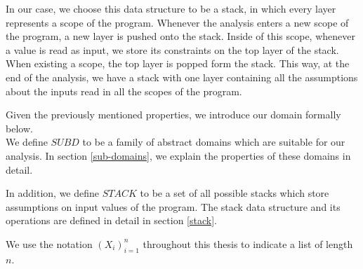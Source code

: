 \documentclass[10pt]{report}
\begin{document}
In our case, we choose this data structure to be a stack, in which every layer represents a scope of the program. Whenever the analysis enters a new scope of the program, a new layer is pushed onto the stack. Inside of this scope, whenever a value is read as input, we store its constraints on the top layer of the stack. When existing a scope, the top layer is popped form the stack. This way, at the end of the analysis, we have a stack with one layer containing all the assumptions about the inputs read in all the scopes of the program. 

Given the previously mentioned properties, we introduce our domain formally below. \\


We define $SUBD$ to be a family of abstract domains which are suitable for our analysis. In section \ref{sub-domains}, we explain the properties of these domains in detail.  

In addition, we define $STACK$ to be a set of all possible stacks which store assumptions on input values of the program. The stack data structure and its operations are defined in detail in section \ref{stack}. 

We use the notation $ (X_{i})_{i=1}^{n} $ throughout this thesis to indicate a list of length $ n $.  \\
\end{document}
